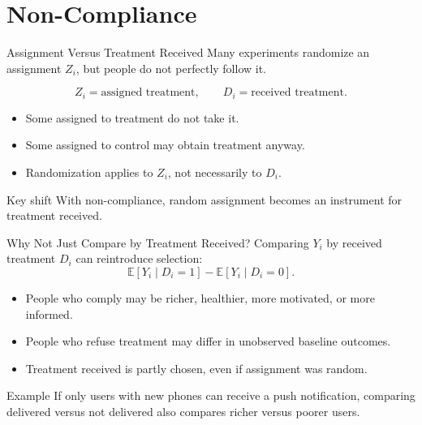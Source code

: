 \documentclass[11pt,aspectratio=169]{beamer}
\newcommand{\E}{\mathbb{E}}
\begin{document}
\section{Non-Compliance}

\begin{frame}{Assignment Versus Treatment Received}
  \hypertarget{main:noncompliance}{}
  Many experiments randomize an assignment \(Z_i\), but people do not perfectly follow it.

  \[
    Z_i = \text{assigned treatment},
    \qquad
    D_i = \text{received treatment}.
  \]

  \begin{itemize}
    \item Some assigned to treatment do not take it.
    \item Some assigned to control may obtain treatment anyway.
    \item Randomization applies to \(Z_i\), not necessarily to \(D_i\).
  \end{itemize}

  \begin{block}{Key shift}
    With non-compliance, random assignment becomes an instrument for treatment received.
  \end{block}
\end{frame}

\begin{frame}{Why Not Just Compare by Treatment Received?}
  Comparing \(Y_i\) by received treatment \(D_i\) can reintroduce selection:
  \[
    \E[Y_i\mid D_i=1]-\E[Y_i\mid D_i=0].
  \]

  \begin{itemize}
    \item People who comply may be richer, healthier, more motivated, or more informed.
    \item People who refuse treatment may differ in unobserved baseline outcomes.
    \item Treatment received is partly chosen, even if assignment was random.
  \end{itemize}

  \begin{block}{Example}
    If only users with new phones can receive a push notification, comparing delivered versus not delivered also compares richer versus poorer users.
  \end{block}
\end{frame}
\end{document}
